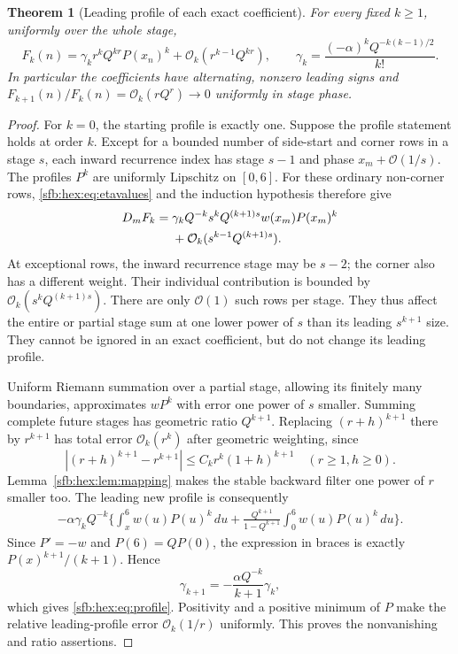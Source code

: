 \documentclass[11pt]{article}
\newtheorem{theorem}{Theorem}[section]
\theoremstyle{remark}\newtheorem{remark}[theorem]{Remark}
\newcommand{\OO}{\mathcal O}
\begin{document}
\begin{theorem}[Leading profile of each exact coefficient]\label{sfb:hex:thm:profiles}
For every fixed $k\ge1$, uniformly over the whole stage,
\begin{equation}\label{sfb:hex:eq:profile}
 F_k(n)=\gamma_k r^kQ^{kr}P(x_n)^k
       +\OO_k(r^{k-1}Q^{kr}),\qquad
 \gamma_k=\frac{(-\alpha)^kQ^{-k(k-1)/2}}{k!}.
\end{equation}
In particular the coefficients have alternating, nonzero leading signs and
$F_{k+1}(n)/F_k(n)=\OO_k(rQ^r)\to0$ uniformly in stage phase.
\end{theorem}
\begin{proof}
For $k=0$, the starting profile is exactly one. Suppose the profile statement holds at order $k$. Except for a bounded number of side-start and corner rows in a stage $s$, each inward recurrence index has stage $s-1$ and phase $x_m+\OO(1/s)$. The profiles $P^k$ are uniformly Lipschitz on $[0,6]$. For these ordinary non-corner rows, \eqref{sfb:hex:eq:etavalues} and the induction hypothesis therefore give
\begin{align}
 D_mF_k={}&\gamma_k Q^{-k}s^kQ^{(k+1)s}w(x_m)P(x_m)^k\notag\\
 &+\OO_k(s^{k-1}Q^{(k+1)s}).\label{sfb:hex:eq:profileforcing}
\end{align}
At exceptional rows, the inward recurrence stage may be $s-2$; the corner also has a different weight. Their individual contribution is bounded by $\OO_k(s^kQ^{(k+1)s})$. There are only $\OO(1)$ such rows per stage. They thus affect the entire or partial stage sum at one lower power of $s$ than its leading $s^{k+1}$ size. They cannot be ignored in an exact coefficient, but do not change its leading profile.

Uniform Riemann summation over a partial stage, allowing its finitely many boundaries, approximates $wP^k$ with error one power of $s$ smaller. Summing complete future stages has geometric ratio $Q^{k+1}$. Replacing $(r+h)^{k+1}$ there by $r^{k+1}$ has total error $\OO_k(r^k)$ after geometric weighting, since
\[
 |(r+h)^{k+1}-r^{k+1}|
 \le C_k r^k(1+h)^{k+1}\quad(r\ge1,h\ge0).
\]
Lemma~\ref{sfb:hex:lem:mapping} makes the stable backward filter one power of $r$ smaller too. The leading new profile is consequently
\begin{align}
 -\alpha\gamma_k Q^{-k}\biggl\{
  \int_x^6 w(u)P(u)^k\,du
  +\frac{Q^{k+1}}{1-Q^{k+1}}\int_0^6w(u)P(u)^k\,du
 \biggr\}.\label{sfb:hex:eq:profilemap}
\end{align}
Since $P'=-w$ and $P(6)=QP(0)$, the expression in braces is exactly $P(x)^{k+1}/(k+1)$. Hence
\[
 \gamma_{k+1}=-\frac{\alpha Q^{-k}}{k+1}\gamma_k,
\]
which gives \eqref{sfb:hex:eq:profile}. Positivity and a positive minimum of $P$ make the relative leading-profile error $\OO_k(1/r)$ uniformly. This proves the nonvanishing and ratio assertions.
\end{proof}
\end{document}
